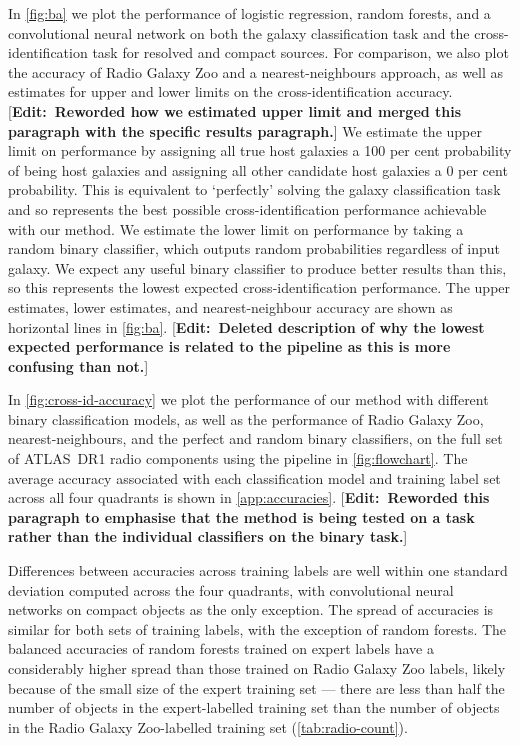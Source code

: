 \documentclass[fleqn,usenatbib,usedcolumn]{mnras}
\newcommand{\edit}[1]{ {\color{red}[{\bf Edit:~{#1}}]} }
\begin{document}
    In \autoref{fig:ba} we plot the performance of logistic regression, random forests, and a convolutional neural network on both the galaxy
    classification task and the cross-identification task for resolved and compact sources. For comparison, we also plot the accuracy of Radio Galaxy
    Zoo and a nearest-neighbours approach, as well as estimates for upper and lower limits on the cross-identification accuracy. \edit{Reworded how we estimated upper limit and merged this paragraph with the specific results paragraph.} We estimate the upper limit on performance by assigning all true host galaxies a 100 per cent probability of being host galaxies and assigning all other candidate host galaxies a 0 per cent probability. This is equivalent to `perfectly' solving the galaxy classification task and so represents the best possible cross-identification performance achievable with our method. We estimate the lower limit on performance by taking a random binary classifier, which outputs random probabilities regardless of input galaxy. We expect any useful binary classifier to produce better results than this, so this represents the lowest expected cross-identification performance. The upper estimates, lower estimates, and nearest-neighbour accuracy are shown as horizontal lines in \autoref{fig:ba}. \edit{Deleted description of why the lowest expected performance is related to the pipeline as this is more confusing than not.}

    In \autoref{fig:cross-id-accuracy} we plot the performance of our method with different binary classification models, as well as the performance of Radio Galaxy Zoo, nearest-neighbours, and the perfect and random binary classifiers, on the full set of ATLAS~DR1 radio components using the pipeline in \autoref{fig:flowchart}. The average accuracy associated with each classification model and training label set across all four quadrants is shown in \autoref{app:accuracies}. \edit{Reworded this paragraph to emphasise that the method is being tested on a task rather than the individual classifiers on the binary task.}

    Differences between accuracies across training labels are well within one standard deviation computed across the four quadrants, with convolutional neural networks on compact objects as the only exception. The spread of accuracies is similar for both sets of training labels, with the exception of random forests. The balanced accuracies of random forests trained on expert labels have a considerably higher spread than those trained on Radio Galaxy Zoo labels, likely because of the small size of the expert training set --- there are less than half the number of objects in the expert-labelled training set than the number of objects in the Radio Galaxy Zoo-labelled training set (\autoref{tab:radio-count}).
\end{document}
